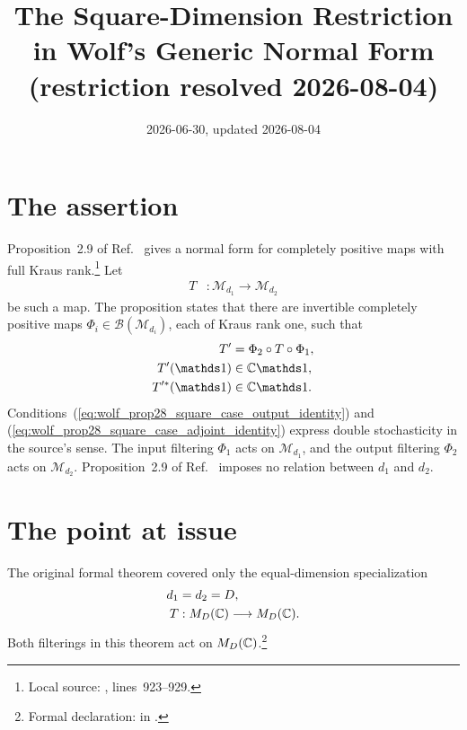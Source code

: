 \documentclass{article}
\title{The Square-Dimension Restriction in Wolf's Generic Normal Form\\
{\large (restriction resolved 2026-08-04)}}
\author{}
\date{2026-06-30, updated 2026-08-04}
\begin{document}
\maketitle
{}

\section{The assertion}

Proposition~2.9 of Ref.~\cite{Wolf2012Quantum} gives a normal form for
completely positive maps with full Kraus rank.\footnote{Local source:
, lines~923--929.}
Let
\begin{align}
    T&:\mathcal{M}_{d_1}\longrightarrow\mathcal{M}_{d_2}
    \label{eq:wolf_prop28_square_case_source_map}
\end{align}
be such a map. The proposition states that there are invertible completely
positive maps $\Phi_i\in\mathcal{B}(\mathcal{M}_{d_i})$, each of Kraus rank
one, such that
\begin{align}
    T'&=\Phi_2\circ T\circ\Phi_1,
    \label{eq:wolf_prop28_square_case_filtered_map}\\
    T'(\one)&\in\C\one,
    \label{eq:wolf_prop28_square_case_output_identity}\\
    T'^{*}(\one)&\in\C\one.
    \label{eq:wolf_prop28_square_case_adjoint_identity}
\end{align}
Conditions~(\ref{eq:wolf_prop28_square_case_output_identity}) and
(\ref{eq:wolf_prop28_square_case_adjoint_identity}) express double
stochasticity in the source's sense. The input filtering $\Phi_1$ acts on
$\mathcal{M}_{d_1}$, and the output filtering $\Phi_2$ acts on
$\mathcal{M}_{d_2}$. Proposition~2.9 of Ref.~\cite{Wolf2012Quantum} imposes
no relation between $d_1$ and $d_2$.

\section{The point at issue}

The original formal theorem covered only the equal-dimension specialization
\begin{align}
    d_1&=d_2=D,
    \label{eq:wolf_prop28_square_case_equal_dimensions}\\
    T&:M_{D}(\mathbb{C})\longrightarrow M_{D}(\mathbb{C}).
    \label{eq:wolf_prop28_square_case_square_map}
\end{align}
Both filterings in this theorem act on $M_{D}(\mathbb{C})$.\footnote{Formal declaration:
 in
.}
\end{document}
